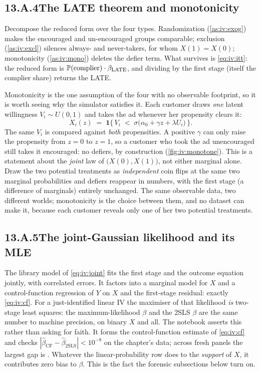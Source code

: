\subsection*{13.A.4\quad The LATE theorem and monotonicity}

Decompose the reduced form over the four types. Randomization (\cref{as:iv:exog}) makes the
encouraged and un-encouraged groups comparable; exclusion (\cref{as:iv:excl}) silences always- and
never-takers, for whom $X(1) = X(0)$; monotonicity (\cref{as:iv:mono}) deletes the defier term. What
survives is \cref{eq:iv:itt}: the reduced form is $\operatorname{\mathbb{P}}(\text{complier})\cdot\beta_{\text{LATE}}$,
and dividing by the first stage (itself the complier share) returns the LATE.

Monotonicity is the one assumption of the four with no observable footprint, so it is worth seeing
why the simulator satisfies it. Each customer draws \emph{one} latent willingness
$V_i \sim U(0,1)$ and takes the ad whenever her propensity clears it:
%
\begin{equation}
  X_i(z) \;=\; \mathbf 1\Big\{\, V_i \;<\; \sigma\big(\alpha_0 + \gamma z + \lambda U_i\big) \,\Big\}.
  \label{eq:iv:vocab_latent}
\end{equation}
%
The same $V_i$ is compared against \emph{both} propensities. A positive $\gamma$ can only raise the
propensity from $z=0$ to $z=1$, so a customer who took the ad unencouraged still takes it encouraged:
no defiers, by construction (\cref{fig:iv:monotone}). This is a statement about the \emph{joint} law
of $\big(X(0), X(1)\big)$, not either marginal alone. Draw the two potential treatments as
\emph{independent} coin flips at the same two marginal probabilities and defiers reappear in numbers,
with the first stage (a difference of marginals) entirely unchanged. The same observable data,
two different worlds; monotonicity is the choice between them, and no dataset can make it, because
each customer reveals only one of her two potential treatments.

\subsection*{13.A.5\quad The joint-Gaussian likelihood and its MLE}

The library model of \cref{eq:iv:joint} fits the first stage and the outcome equation jointly, with
correlated errors. It factors into a marginal model for $X$ and a control-function regression of $Y$
on $X$ and the first-stage residual: exactly \cref{eq:iv:cf}. For a just-identified linear IV the
maximiser of that likelihood \emph{is} two-stage least squares: the maximum-likelihood $\beta$ and
the 2SLS $\beta$ are the same number to machine precision, on binary $X$ and all. The notebook
asserts this rather than asking for faith. It forms the control-function estimate of
\cref{eq:iv:cf} and checks $|\hat\beta_{\text{CF}} - \hat\beta_{\text{2SLS}}| < 10^{-8}$ on the
chapter's data; across \nbElevenCfSeeds{} fresh panels the largest gap is \nbElevenCfMaxdiff.
Whatever the linear-probability row does to the \emph{support} of $X$, it contributes zero bias to
$\beta$. This is the fact the forensic subsections below turn on.


